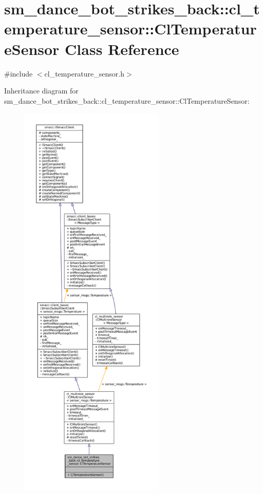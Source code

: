 \hypertarget{classsm__dance__bot__strikes__back_1_1cl__temperature__sensor_1_1ClTemperatureSensor}{}\section{sm\+\_\+dance\+\_\+bot\+\_\+strikes\+\_\+back\+:\+:cl\+\_\+temperature\+\_\+sensor\+:\+:Cl\+Temperature\+Sensor Class Reference}
\label{classsm__dance__bot__strikes__back_1_1cl__temperature__sensor_1_1ClTemperatureSensor}


{\ttfamily \#include $<$cl\+\_\+temperature\+\_\+sensor.\+h$>$}



Inheritance diagram for sm\+\_\+dance\+\_\+bot\+\_\+strikes\+\_\+back\+:\+:cl\+\_\+temperature\+\_\+sensor\+:\+:Cl\+Temperature\+Sensor\+:
\nopagebreak
\begin{figure}[H]
\begin{center}
\leavevmode
\includegraphics[height=550pt]{classsm__dance__bot__strikes__back_1_1cl__temperature__sensor_1_1ClTemperatureSensor__inherit__graph}
\end{center}
\end{figure}


